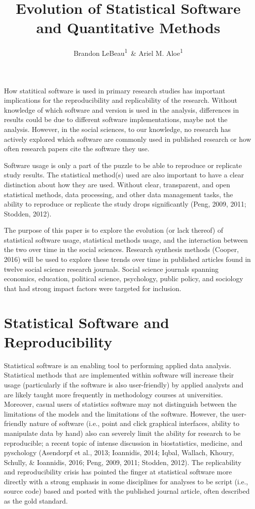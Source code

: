 \documentclass[english,,man]{apa6}
\title{Evolution of Statistical Software and Quantitative Methods}
\author{Brandon LeBeau\textsuperscript{1}~\& Ariel M. Aloe\textsuperscript{1}}
\date{}
\affiliation{
\vspace{0.5cm}
\textsuperscript{1} University of Iowa}
\theoremstyle{definition}
\theoremstyle{definition}
\theoremstyle{definition}
\theoremstyle{remark}
\begin{document}
\maketitle

How statitical software is used in primary research studies has
important implications for the reproducibility and replicability of the
research. Without knowledge of which software and version is used in the
analysis, differences in results could be due to different software
implementations, maybe not the analysis. However, in the social
sciences, to our knowledge, no research has actively explored which
software are commonly used in published research or how often research
papers cite the software they use.

Software usage is only a part of the puzzle to be able to reproduce or
replicate study results. The statistical method(s) used are also
important to have a clear distinction about how they are used. Without
clear, transparent, and open statistical methods, data processing, and
other data management tasks, the ability to reproduce or replicate the
study drops significantly (Peng, 2009, 2011; Stodden, 2012).

The purpose of this paper is to explore the evolution (or lack thereof)
of statistical software usage, statistical methods usage, and the
interaction between the two over time in the social sciences. Research
synthesis methods (Cooper, 2016) will be used to explore these trends
over time in published articles found in twelve social science research
journals. Social science journals spanning economics, education,
political science, psychology, public policy, and sociology that had
strong impact factors were targeted for inclusion.

\hypertarget{statistical-software-and-reproducibility}{%
\section{Statistical Software and
Reproducibility}\label{statistical-software-and-reproducibility}}

Statistical software is an enabling tool to performing applied data
analysis. Statistical methods that are implemented within software will
increase their usage (particularly if the software is also
user-friendly) by applied analysts and are likely taught more frequently
in methodology courses at universities. Moreover, casual users of
statistics software may not distinguish between the limitations of the
models and the limitations of the software. However, the user-friendly
nature of software (i.e., point and click graphical interfaces, ability
to manipulate data by hand) also can severely limit the ability for
research to be reproducible; a recent topic of intense discussion in
biostatistics, medicine, and pyschology (Asendorpf et al., 2013;
Ioannidis, 2014; Iqbal, Wallach, Khoury, Schully, \& Ioannidis, 2016;
Peng, 2009, 2011; Stodden, 2012). The replicability and reproducibility
crisis has pointed the finger at statistical software more directly with
a strong emphasis in some disciplines for analyses to be script (i.e.,
source code) based and posted with the published journal article, often
described as the gold standard.
\end{document}
